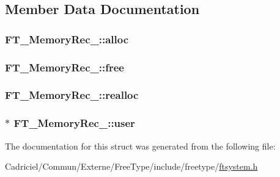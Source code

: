 \subsection{Member Data Documentation}
\hypertarget{struct_f_t___memory_rec___a2269eada6afbb008fe5c73707145410c}{
\subsubsection[{alloc}]{ F\-T\-\_\-\-Memory\-Rec\-\_\-\-::alloc}}\label{struct_f_t___memory_rec___a2269eada6afbb008fe5c73707145410c}
\hypertarget{struct_f_t___memory_rec___a83ab2422bd9265d8731b9e5e368ba240}{
\subsubsection[{free}]{ F\-T\-\_\-\-Memory\-Rec\-\_\-\-::free}}\label{struct_f_t___memory_rec___a83ab2422bd9265d8731b9e5e368ba240}
\hypertarget{struct_f_t___memory_rec___a5ce3424cc72e898fe973ffeabe44a95c}{
\subsubsection[{realloc}]{ F\-T\-\_\-\-Memory\-Rec\-\_\-\-::realloc}}\label{struct_f_t___memory_rec___a5ce3424cc72e898fe973ffeabe44a95c}
\hypertarget{struct_f_t___memory_rec___aae5bc614434ba4525e37d7faaf03c4b7}{
\subsubsection[{user}]{$\ast$ F\-T\-\_\-\-Memory\-Rec\-\_\-\-::user}}\label{struct_f_t___memory_rec___aae5bc614434ba4525e37d7faaf03c4b7}


The documentation for this struct was generated from the following file\-:\begin{DoxyCompactItemize}
\item 
Cadriciel/\-Commun/\-Externe/\-Free\-Type/include/freetype/\hyperlink{ftsystem_8h}{ftsystem.\-h}\end{DoxyCompactItemize}
